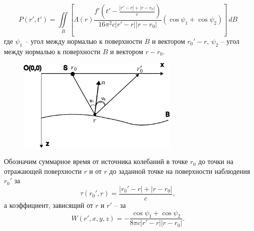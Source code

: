 \documentclass[a4paper, fontsize=14pt]{article}
\begin{document}

	\begin{equation}
		P(r',t') = \iint\limits_{B} \left[\Lambda(r) \frac{f'\left(t'-\frac{|r'-r|+|r-r_0|}{c}\right) }{16\pi^2c|r'-r||r-r_0|} (\cos \psi_1 + \cos \psi_2) \right] \,dB
		\label{eq:modapx}
	\end{equation}
где $\psi_1$ -- угол между нормалью к поверхности $B$ и вектором $r_0'-r$,
$\psi_2$ -- угол между нормалью к поверхности $B$ и вектором $r-r_0$. 

\begin{figure}[h]
	\centering
	\includegraphics[width=0.7\textwidth]{model_fig.pdf}
	\caption{}
	\label{fig:model}
\end{figure}
Обозначим суммарное время от источника колебаний в точке $r_0$ до точки на отражающей поверхности $r$ и от $r$ до заданной точке на поверхности наблюдения $r_0'$ за $$\tau(r_0',r) =\frac{|r_0'-r|+|r-r_0|}{c},$$ а коэффициент, зависящий от $r$ и $r'$ -- за 
$$
	W(r',x,y,z) = - \frac{\cos \psi_1 + \cos \psi_2}{8\pi c|r'-r||r-r_0|}.
$$ 
\end{document}
